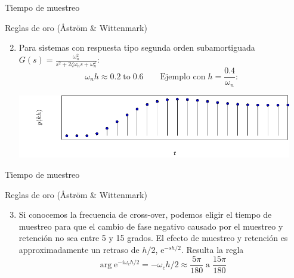 \documentclass[presentation,aspectratio=169]{beamer}
\begin{document}
\begin{frame}[label={sec:orge105877}]{Tiempo de muestreo}
\begin{block}{Reglas de oro (Åström \& Wittenmark)}
\begin{enumerate}
\setcounter{enumi}{1}
\item Para sistemas con respuesta tipo segunda orden subamortiguada \(G(s) = \frac{\omega_n^2}{s^2 + 2\zeta\omega_n s + \omega_n^2}:\) 
\[ \omega_n h \approx 0.2 \; \text{to} \; 0.6 \qquad \text{Ejemplo con}\; h = \frac{0.4}{\omega_n}:\]

\begin{center}
\includegraphics[width=12cm]{second-order-response-example}
\end{center}
\end{enumerate}
\end{block}
\end{frame}
\begin{frame}[label={sec:org97ad0de}]{Tiempo de muestreo}
\begin{block}{Reglas de oro (Åström \& Wittenmark)}
\begin{enumerate}
\setcounter{enumi}{2}
\item Si conocemos la frecuencia de cross-over, podemos eligir el tiempo de muestreo para que el cambio de fase negativo causado por el muestreo y retención no sea entre 5 y 15 grados. El efecto de muestreo y retención es approximadamente un retraso de \(h/2\), \(\mathrm{e}^{-sh/2}\). Resulta la regla
\[ \arg \mathrm{e}^{-i\omega_c h/2} = -\omega_c h/2 \approx \frac{5\pi}{180} \; \text{a} \; \frac{15\pi}{180}\]
\end{enumerate}
\end{block}
\end{frame}
\end{document}
